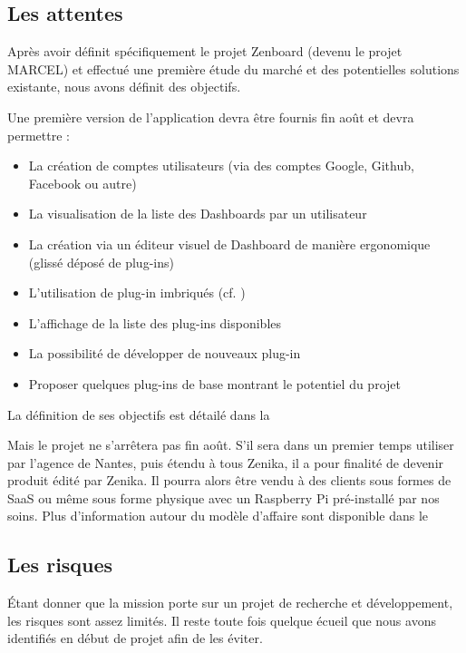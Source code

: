 \subsection{Les attentes}

  Après avoir définit spécifiquement le projet Zenboard (devenu le projet MARCEL) et effectué une première étude du marché et des potentielles solutions existante, nous avons définit des objectifs.

  Une première version de l'application devra être fournis fin août et devra permettre :

  \begin{itemize}
    \item{La création de comptes utilisateurs (via des comptes Google, Github, Facebook ou autre)}
      \item{La visualisation de la liste des Dashboards par un utilisateur}
      \item{La création via un éditeur visuel de Dashboard de manière ergonomique (glissé déposé de plug-ins)}
      \item{L'utilisation de plug-in imbriqués (cf. \textit{})}
      \item{L'affichage de la liste des plug-ins disponibles}
      \item{La possibilité de développer de nouveaux plug-in}
      \item{Proposer quelques plug-ins de base montrant le potentiel du projet}
  \end{itemize}

  La définition de ses objectifs est détailé dans la 

  Mais le projet ne s'arrêtera pas fin août. S'il sera dans un premier temps utiliser par l'agence de Nantes, puis étendu à tous Zenika, il a pour finalité de devenir produit édité par Zenika. Il pourra alors être vendu à des clients sous formes de \gls{SaaS} ou même sous forme physique avec un Raspberry Pi pré-installé par nos soins. Plus d'information autour du modèle d'affaire sont disponible dans le 

\subsection{Les risques}
  \label{sec:risques}

  Étant donner que la mission porte sur un projet de recherche et développement, les risques sont assez limités. Il reste toute fois quelque écueil que nous avons identifiés en début de projet afin de les éviter.

